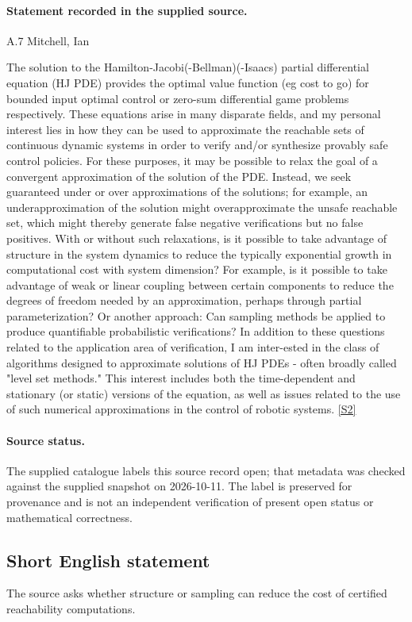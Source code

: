 \documentclass[11pt]{article}
\begin{document}
\paragraph{Statement recorded in the supplied source.}
A.7 Mitchell, Ian

The solution to the Hamilton-Jacobi(-Bellman)(-Isaacs) partial differential equation (HJ PDE) provides the optimal value function (eg cost to go) for bounded input optimal control or zero-sum differential game problems respectively. These equations arise in many disparate fields, and my personal interest lies in how they can be used to approximate the reachable sets of continuous dynamic systems in order to verify and/or synthesize provably safe control policies. For these purposes, it may be possible to relax the goal of a convergent approximation of the solution of the PDE. Instead, we seek guaranteed under or over approximations of the solutions; for example, an underapproximation of the solution might overapproximate the unsafe reachable set, which might thereby generate false negative verifications but no false positives. With or without such relaxations, is it possible to take advantage of structure in the system dynamics to reduce the typically exponential growth in computational cost with system dimension? For example, is it possible to take advantage of weak or linear coupling between certain components to reduce the degrees of freedom needed by an approximation, perhaps through partial parameterization? Or another approach: Can sampling methods be applied to produce quantifiable probabilistic verifications? In addition to these questions related to the application area of verification, I am inter-ested in the class of algorithms designed to approximate solutions of HJ PDEs - often broadly called "level set methods." This interest includes both the time-dependent and stationary (or static) versions of the equation, as well as issues related to the use of such numerical approximations in the control of robotic systems. \href{https://aimath.org/WWN/optimalcontrol/optimalcontrol.pdf}{[S2]}
\paragraph{Source status.}
The supplied catalogue labels this source record open; that metadata was checked against the supplied snapshot on 2026-10-11. The label is preserved for provenance and is not an independent verification of present open status or mathematical correctness.
\subsection{Short English statement}
The source asks whether structure or sampling can reduce the cost of certified reachability computations.
\end{document}
